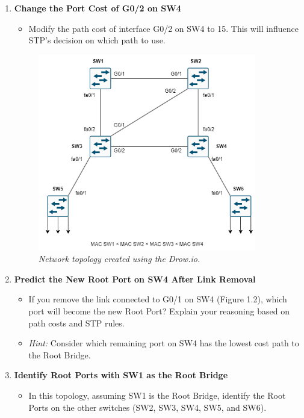 \documentclass[a4paper]{book}
\begin{document}
\begin{enumerate}
    \item \textbf{Change the Port Cost of G0/2 on SW4}
    \begin{itemize}
        \item Modify the path cost of interface G0/2 on SW4 to 15. This will influence STP’s decision on which path to use. 
    \end{itemize}

    \begin{figure}[h]
        \centering
        \includegraphics[width=0.9\textwidth]{img/stp02.png}
        \caption{\textit{Network topology created using the Drow.io.}}
    \end{figure}
    \newpage


    \item \textbf{Predict the New Root Port on SW4 After Link Removal}
    \begin{itemize}
        \item If you remove the link connected to G0/1 on SW4 (Figure 1.2), which port will become the new Root Port? Explain your reasoning based on path costs and STP rules.
        \item \textit{Hint:} Consider which remaining port on SW4 has the lowest cost path to the Root Bridge.
    \end{itemize}

    \item \textbf{Identify Root Ports with SW1 as the Root Bridge}
    \begin{itemize}
        \item In this topology, assuming SW1 is the Root Bridge, identify the Root Ports on the other switches (SW2, SW3, SW4, SW5, and SW6).
 

\end{itemize}
\end{enumerate}
\end{document}

